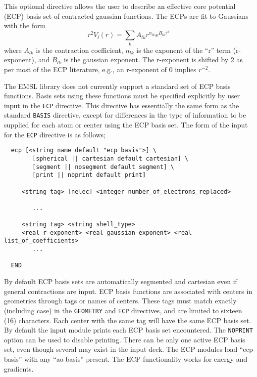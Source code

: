 \label{sec:ecp}

This optional directive allows the user to describe an 
effective core potential (ECP) basis set
of contracted gaussian functions.  The ECPs are fit to Gaussians 
with the form 
\[
 r^2V_l(r) = \sum_{k} A_{lk} r^{n_{lk}} e^{B_{lk}r^{2}}
\]
where $A_{lk}$ is the contraction coefficient, $n_{lk}$ is the
exponent of the ``r'' term (r-exponent), and $B_{lk}$ is the gaussian
exponent.  The r-exponent is shifted by 2 as per most of the ECP
literature, e.g., an r-exponent of 0 implies $r^{-2}$.

The EMSL library does not currently support a standard set of ECP basis
functions.  Basis sets using these functions must be specified explicitly
by user input in the \verb+ECP+ directive.  This directive has
essentially the same form as the standard \verb+BASIS+ directive,
except for differences in the type of information to be supplied for
each atom or center using the ECP basis set.  The form of the input for
the \verb+ECP+ directive is as follows;

\begin{verbatim}
  ecp [<string name default "ecp basis">] \
        [spherical || cartesian default cartesian] \
        [segment || nosegment default segment] \
        [print || noprint default print]

     <string tag> [nelec] <integer number_of_electrons_replaced>
 
        ...

     <string tag> <string shell_type>
     <real r-exponent> <real gaussian-exponent> <real list_of_coefficients>
        ...
     
  END
\end{verbatim}    

By default ECP basis sets are automatically segmented and cartesian
even if general contractions are input. 
ECP basis functions are associated with centers in geometries through
tags or names of centers.  These tags must match exactly (including case)
in the \verb+GEOMETRY+ and \verb+ECP+ directives, 
and are limited to sixteen (16) characters.  Each center with the same
tag will have the same ECP basis set.  By default the input module
prints each ECP basis set encountered.  The \verb+NOPRINT+ option
can be used
to disable printing.  There can be only one active ECP basis set, even
though several may exist in the input deck.  The ECP modules load
``ecp basis'' with any ``ao basis'' present.  The ECP functionality
works for energy and gradients.

